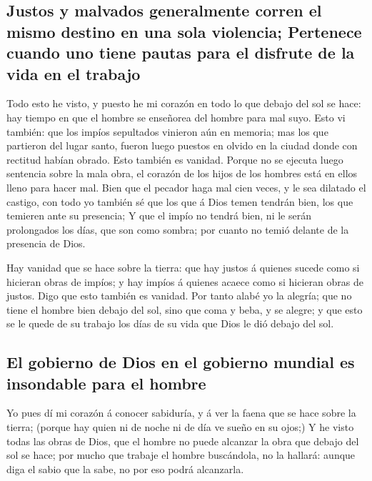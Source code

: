 \hypertarget{justos-y-malvados-generalmente-corren-el-mismo-destino-en-una-sola-violencia-pertenece-cuando-uno-tiene-pautas-para-el-disfrute-de-la-vida-en-el-trabajo}{%
\subsection{Justos y malvados generalmente corren el mismo destino en
una sola violencia; Pertenece cuando uno tiene pautas para el disfrute
de la vida en el
trabajo}\label{justos-y-malvados-generalmente-corren-el-mismo-destino-en-una-sola-violencia-pertenece-cuando-uno-tiene-pautas-para-el-disfrute-de-la-vida-en-el-trabajo}}

 Todo esto he visto, y puesto he mi corazón en todo lo que
debajo del sol se hace: hay tiempo en que el hombre se enseñorea del
hombre para mal suyo.  Esto vi también: que los impíos
sepultados vinieron aún en memoria; mas los que partieron del lugar
santo, fueron luego puestos en olvido en la ciudad donde con rectitud
habían obrado. Esto también es vanidad.  Porque no se
ejecuta luego sentencia sobre la mala obra, el corazón de los hijos de
los hombres está en ellos lleno para hacer mal.  Bien que
el pecador haga mal cien veces, y le sea dilatado el castigo, con todo
yo también sé que los que á Dios temen tendrán bien, los que temieren
ante su presencia;  Y que el impío no tendrá bien, ni le
serán prolongados los días, que son como sombra; por cuanto no temió
delante de la presencia de Dios.

 Hay vanidad que se hace sobre la tierra: que hay justos
á quienes sucede como si hicieran obras de impíos; y hay impíos á
quienes acaece como si hicieran obras de justos. Digo que esto también
es vanidad.  Por tanto alabé yo la alegría; que no tiene
el hombre bien debajo del sol, sino que coma y beba, y se alegre; y que
esto se le quede de su trabajo los días de su vida que Dios le dió
debajo del sol.

\hypertarget{el-gobierno-de-dios-en-el-gobierno-mundial-es-insondable-para-el-hombre}{%
\subsection{El gobierno de Dios en el gobierno mundial es insondable
para el
hombre}\label{el-gobierno-de-dios-en-el-gobierno-mundial-es-insondable-para-el-hombre}}

 Yo pues dí mi corazón á conocer sabiduría, y á ver la
faena que se hace sobre la tierra; (porque hay quien ni de noche ni de
día ve sueño en su ojos;)  Y he visto todas las obras de
Dios, que el hombre no puede alcanzar la obra que debajo del sol se
hace; por mucho que trabaje el hombre buscándola, no la hallará: aunque
diga el sabio que la sabe, no por eso podrá alcanzarla.

